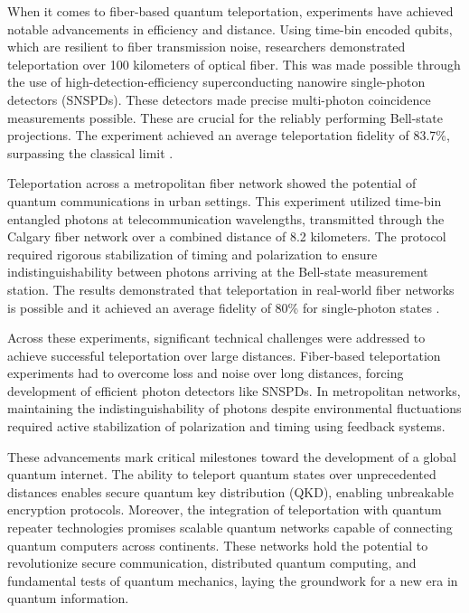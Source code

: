 When it comes to fiber-based quantum teleportation, experiments have achieved notable advancements in efficiency and distance. Using time-bin encoded qubits, 
which are resilient to fiber transmission noise, researchers demonstrated teleportation over 100 kilometers of optical fiber. 
This was made possible through the use of high-detection-efficiency superconducting nanowire single-photon detectors (SNSPDs). 
These detectors made precise multi-photon coincidence measurements possible. These are crucial for the reliably performing Bell-state projections. 
The experiment achieved an average teleportation fidelity of 83.7\%, surpassing the classical limit \cite{Takesue:2015}.

Teleportation across a metropolitan fiber network showed the potential of quantum communications in urban settings. 
This experiment utilized time-bin entangled photons at telecommunication wavelengths, transmitted through the Calgary fiber network over a combined distance of 8.2 kilometers. 
The protocol required rigorous stabilization of timing and polarization to ensure indistinguishability between photons arriving at the Bell-state measurement station. 
The results demonstrated that teleportation in real-world fiber networks is possible and it achieved an average fidelity of 80\% for single-photon states \cite{Valivarthi:2016}.

Across these experiments, significant technical challenges were addressed to achieve successful teleportation over large distances. 
Fiber-based teleportation experiments had to overcome loss and noise over long distances, forcing development of efficient photon detectors like SNSPDs. 
In metropolitan networks, maintaining the indistinguishability of photons despite environmental fluctuations required active stabilization of polarization and timing using feedback systems.

These advancements mark critical milestones toward the development of a global quantum internet. 
The ability to teleport quantum states over unprecedented distances enables secure quantum key distribution (QKD), enabling unbreakable encryption protocols. 
Moreover, the integration of teleportation with quantum repeater technologies promises scalable quantum networks capable of connecting quantum computers across continents. 
These networks hold the potential to revolutionize secure communication, distributed quantum computing, and fundamental tests of quantum mechanics, 
laying the groundwork for a new era in quantum information.

